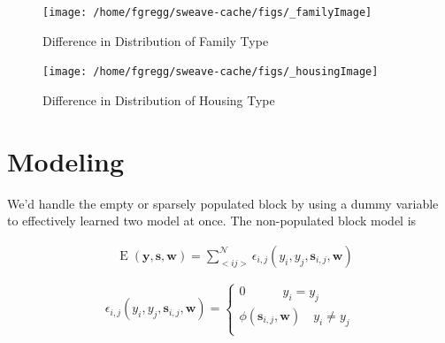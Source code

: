 \documentclass[12pt,letter]{article}\usepackage[]{graphicx}\usepackage[]{color}
\makeatletter
\newenvironment{kframe}{%
 \def\at@end@of@kframe{}%
 \ifinner\ifhmode%
  \def\at@end@of@kframe{\end{minipage}}%
  \begin{minipage}{\columnwidth}%
 \fi\fi%
 \def\FrameCommand##1{\hskip\@totalleftmargin \hskip-\fboxsep
 \colorbox{shadecolor}{##1}\hskip-\fboxsep
     \hskip-\linewidth \hskip-\@totalleftmargin \hskip\columnwidth}%
 \MakeFramed {\advance\hsize-\width
   \@totalleftmargin\z@ \linewidth\hsize
   \@setminipage}}%
 {\par\unskip\endMakeFramed%
 \at@end@of@kframe}
\newenvironment{knitrout}{}{} %
\makeatother
\begin{document}
\begin{figure}
\begin{knitrout}
\color{fgcolor}\begin{kframe}


{\ttfamily\noindent\bfseries\color{errorcolor}{\#\# Error: color intensity nan, not in [0,1]}}\end{kframe}

{\centering \texttt{[image: /home/fgregg/sweave-cache/figs/\_familyImage]} 

}



\end{knitrout}

\caption{Difference in Distribution of Family Type}
\end{figure}


\begin{figure}
\begin{knitrout}
\color{fgcolor}\begin{kframe}


{\ttfamily\noindent\bfseries\color{errorcolor}{\#\# Error: color intensity nan, not in [0,1]}}\end{kframe}

{\centering \texttt{[image: /home/fgregg/sweave-cache/figs/\_housingImage]} 

}



\end{knitrout}

\caption{Difference in Distribution of Housing Type}
\end{figure}

\section*{Modeling}
We'd handle the empty or sparsely populated block by using a dummy
variable to effectively learned two model at once. The non-populated
block model is 

\begin{align}
&\operatorname{E}(\mathbf{y}, \mathbf{s}, \mathbf{w}) = \sum_{<i
    j>}^{\mathcal{N}}\epsilon_{i,j}(y_i, y_j, \mathbf{s}_{i,j}, \mathbf{w})  
\end{align}

\begin{equation}
\epsilon_{i,j}(y_i, y_j, \mathbf{s}_{i,j}, \mathbf{w}) = \begin{cases}
    0 \quad\quad\quad y_i = y_j \\
    \phi(\mathbf{s}_{i,j}, \mathbf{w}) \quad y_i \neq y_j \\
  \end{cases}
\end{equation}
\end{document}
